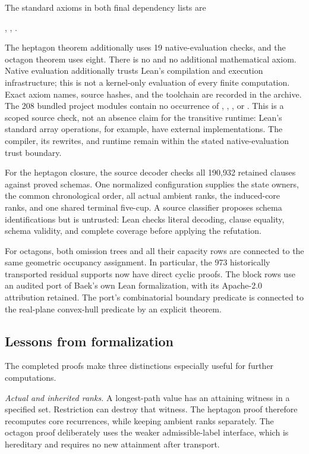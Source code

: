 The standard axioms in both final dependency lists are
\begin{center}
, , .
\end{center}
The heptagon theorem additionally uses 19 native-evaluation checks,
and the octagon theorem uses eight. There is no  and no
additional mathematical axiom. Native evaluation additionally trusts
Lean's compilation and execution infrastructure; this is not a
kernel-only evaluation of every finite computation. Exact axiom names,
source hashes, and the toolchain are recorded in the archive.
The 208 bundled project modules contain no occurrence of
, , , or .
This is a scoped source check, not an absence claim for the transitive
runtime: Lean's standard array operations, for example, have external
implementations. The compiler, its rewrites, and runtime remain
within the stated native-evaluation trust boundary.

For the heptagon closure, the source decoder checks all 190,932 retained
clauses against proved schemas. One normalized configuration supplies
the state owners, the common chronological order, all actual ambient
ranks, the induced-core ranks, and one shared terminal five-cup.
A source classifier proposes schema identifications but is untrusted:
Lean checks literal decoding, clause equality, schema validity, and
complete coverage before applying the refutation.

For octagons, both omission trees and all their capacity rows are
connected to the same geometric occupancy assignment. In particular,
the 973 historically transported residual supports now have direct
cyclic proofs. The block rows use an audited port of Baek's own Lean
formalization, with its Apache-2.0 attribution retained. The port's
combinatorial boundary predicate is connected to the real-plane
convex-hull predicate by an explicit theorem.

\subsection{Lessons from formalization}
The completed proofs make three distinctions especially useful for
further computations.

\emph{Actual and inherited ranks.} A longest-path value has an attaining
witness in a specified set. Restriction can destroy that witness.
The heptagon proof therefore recomputes core recurrences, while keeping
ambient ranks separately. The octagon proof deliberately uses the
weaker admissible-label interface, which is hereditary and requires no
new attainment after transport.

